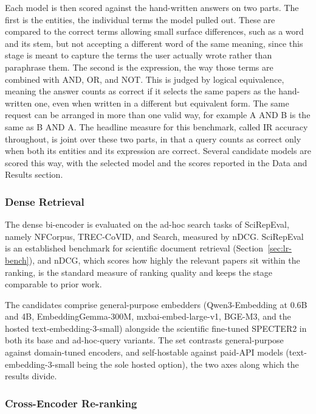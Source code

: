 Each model is then scored against the hand-written answers on two parts. The first is the entities, the individual terms the model pulled out. These are compared to the correct terms allowing small surface differences, such as a word and its stem, but not accepting a different word of the same meaning, since this stage is meant to capture the terms the user actually wrote rather than paraphrase them. The second is the expression, the way those terms are combined with AND, OR, and NOT. This is judged by logical equivalence, meaning the answer counts as correct if it selects the same papers as the hand-written one, even when written in a different but equivalent form. The same request can be arranged in more than one valid way, for example A AND B is the same as B AND A. The headline measure for this benchmark, called IR accuracy throughout, is joint over these two parts, in that a query counts as correct only when both its entities and its expression are correct. Several candidate models are scored this way, with the selected model and the scores reported in the Data and Results section.

\subsubsection{Dense Retrieval}
\label{subsubsec:dense-retrieval}

The dense bi-encoder is evaluated on the ad-hoc search tasks of SciRepEval, namely NFCorpus, TREC-CoVID, and Search, measured by nDCG. SciRepEval is an established benchmark for scientific document retrieval (Section~\ref{sec:lr-bench}), and nDCG, which scores how highly the relevant papers sit within the ranking, is the standard measure of ranking quality and keeps the stage comparable to prior work.

The candidates comprise general-purpose embedders (Qwen3-Embedding at 0.6B and 4B, EmbeddingGemma-300M, mxbai-embed-large-v1, BGE-M3, and the hosted text-embedding-3-small) alongside the scientific fine-tuned SPECTER2 in both its base and ad-hoc-query variants. The set contrasts general-purpose against domain-tuned encoders, and self-hostable against paid-API models (text-embedding-3-small being the sole hosted option), the two axes along which the results divide.

\subsubsection{Cross-Encoder Re-ranking}
\label{subsubsec:cross-encoder}


